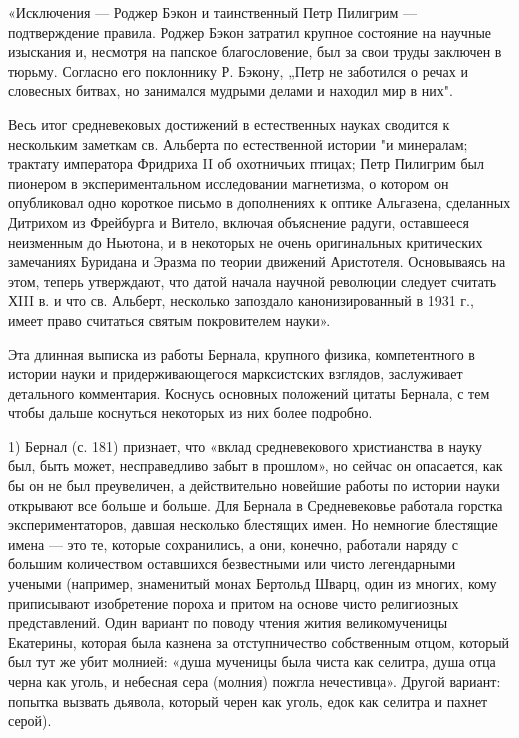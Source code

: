 «Исключения  ---  Роджер  Бэкон   и  таинственный  Петр  Пилигрим  ---
подтверждение  правила. Роджер  Бэкон  затратил  крупное состояние  на
научные изыскания  и, несмотря на  папское благословение, был  за свои
труды заключен в  тюрьму. Согласно его поклоннику Р.  Бэкону, „Петр не
заботился о  речах и словесных  битвах, но занимался мудрыми  делами и
находил мир в них".

Весь итог  средневековых достижений  в естественных науках  сводится к
нескольким заметкам св. Альберта по естественной истории "и минералам;
трактату императора  Фридриха II  об охотничьих птицах;  Петр Пилигрим
был пионером в экспериментальном исследовании магнетизма, о котором он
опубликовал  одно короткое  письмо в  дополнениях к  оптике Альгазена,
сделанных Дитрихом  из Фрейбурга и Витело,  включая объяснение радуги,
оставшееся неизменным до Ньютона, и  в некоторых не очень оригинальных
критических   замечаниях  Буридана   и  Эразма   по  теории   движений
Аристотеля. Основываясь  на этом, теперь утверждают,  что датой начала
научной революции следует считать ХIII в. и что св. Альберт, несколько
запоздало  канонизированный в  1931 г.,  имеет право  считаться святым
покровителем науки».

Эта длинная выписка из  работы Бернала, крупного физика, компетентного
в истории науки и придерживающегося марксистских взглядов, заслуживает
детального комментария.  Коснусь основных положений цитаты  Бернала, с
тем чтобы дальше коснуться некоторых из них более подробно.

1) Бернал (с. 181) признает,  что «вклад средневекового христианства в
науку был,  быть может, несправедливо  забыт в прошлом», но  сейчас он
опасается,  как бы  он не  был преувеличен,  а действительно  новейшие
работы по истории  науки открывают все больше и больше.  Для Бернала в
Средневековье  работала  горстка экспериментаторов,  давшая  несколько
блестящих  имен.  Но немногие  блестящие  имена  --- это  те,  которые
сохранились,  а они,  конечно, работали  наряду с  большим количеством
оставшихся  безвестными  или  чисто  легендарными  учеными  (например,
знаменитый  монах Бертольд  Шварц,  один из  многих, кому  приписывают
изобретение пороха и притом на основе чисто религиозных представлений.
Один вариант по поводу  чтения жития великомученицы Екатерины, которая
была казнена за  отступничество собственным отцом, который  был тут же
убит молнией: «душа  мученицы была чиста как селитра,  душа отца черна
как  уголь,  и  небесная  сера  (молния)  пожгла  нечестивца».  Другой
вариант: попытка  вызвать дьявола, который  черен как уголь,  едок как
селитра и пахнет серой).

